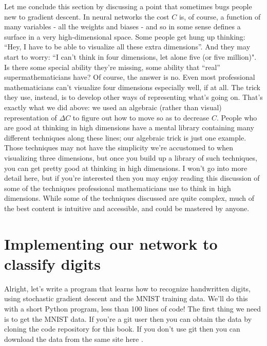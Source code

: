 Let me conclude this section by discussing a point that sometimes bugs people new to gradient descent. In neural networks the cost $C$ is, of course, a function of many variables - all the weights and biases - and so in some sense defines a surface in a very high-dimensional space. Some people get hung up thinking: ``Hey, I have to be able to visualize all these extra dimensions''. And they may start to worry: ``I can't think in four dimensions, let alone five (or five million)". Is there some special ability they're missing, some ability that ``real'' supermathematicians have? Of course, the answer is no. Even most professional mathematicians can't visualize four dimensions especially well, if at all. The trick they use, instead, is to develop other ways of representing what's going on. That's exactly what we did above: we used an algebraic (rather than visual) representation of $\Delta C$ to figure out how to move so as to decrease $C$. People who are good at thinking in high dimensions have a mental library containing many different techniques along these lines; our algebraic trick is just one example. Those techniques may not have the simplicity we're accustomed to when visualizing three dimensions, but once you build up a library of such techniques, you can get pretty good at thinking in high dimensions. I won't go into more detail here, but if you're interested then you may enjoy reading this discussion \cite{mathoverflowhighDthink2019} of some of the techniques professional mathematicians use to think in high dimensions. While some of the techniques discussed are quite complex, much of the best content is intuitive and accessible, and could be mastered by anyone.

\section{Implementing our network to classify digits}
\label{sec:Implementingournetworktoclassifydigits}
Alright, let's write a program that learns how to recognize handwritten digits, using stochastic gradient descent and the MNIST training data. We'll do this with a short Python  program, less than 100 lines of code! The first thing we need is to get the MNIST data. If you're a git user then you can obtain the data by cloning the code repository \cite{Nielsengithub2019} for this book. If you don't use git then you can download the data from the same site here \cite{Nielsengithub2019b}.

